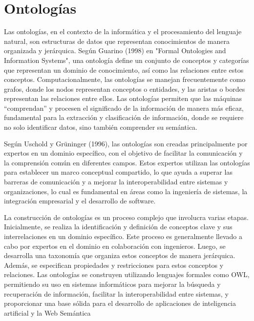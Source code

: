 \section{Ontolog\'ias}

Las ontologías, en el contexto de la informática y el procesamiento del lenguaje natural, son estructuras de datos que representan conocimientos de manera organizada y jerárquica. Según Guarino (1998) en "Formal Ontologies and Information Systems", una ontología define un conjunto de conceptos y categorías que representan un dominio de conocimiento, así como las relaciones entre estos conceptos. Computacionalmente, las ontologías se manejan frecuentemente como grafos, donde los nodos representan conceptos o entidades, y las aristas o bordes representan las relaciones entre ellos. Las ontologías permiten que las máquinas ``comprendan'' y procesen el significado de la información de manera más eficaz, fundamental para la extracción y clasificación de información, donde se requiere no solo identificar datos, sino también comprender su sem\'antica.

Según Uschold y Grüninger (1996), las ontologías son creadas principalmente por expertos en un dominio específico, con el objetivo de facilitar la comunicación y la comprensión común en diferentes campos. Estos expertos utilizan las ontologías para establecer un marco conceptual compartido, lo que ayuda a superar las barreras de comunicación y a mejorar la interoperabilidad entre sistemas y organizaciones, lo cual es fundamental en áreas como la ingeniería de sistemas, la integración empresarial y el desarrollo de software.

La construcción de ontologías es un proceso complejo que involucra varias etapas. Inicialmente, se realiza la identificación y definición de conceptos clave y sus interrelaciones en un dominio específico. Este proceso es generalmente llevado a cabo por expertos en el dominio en colaboración con ingenieros. Luego, se desarrolla una taxonomía que organiza estos conceptos de manera jerárquica. Además, se especifican propiedades y restricciones para estos conceptos y relaciones. Las ontologías se construyen utilizando lenguajes formales como OWL, permitiendo su uso en sistemas informáticos para mejorar la búsqueda y recuperación de información, facilitar la interoperabilidad entre sistemas, y proporcionar una base sólida para el desarrollo de aplicaciones de inteligencia artificial y la Web Semántica 

